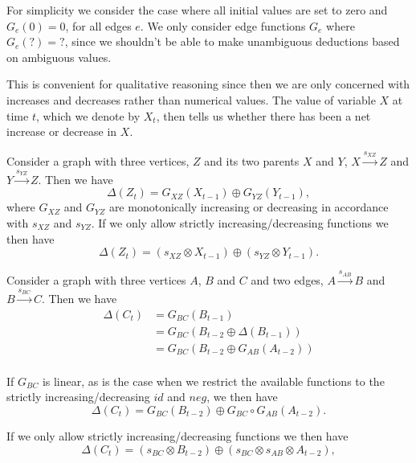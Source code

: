 For simplicity we consider the case where all initial values are
set to zero and $G_e(0)=0$, for all edges $e$. We only consider edge functions
$G_e$ where $G_e(?) = ?$, since we shouldn't be able to make unambiguous
deductions based on ambiguous values.
%

This is convenient for qualitative reasoning since then we are only
concerned with increases and decreases rather than numerical values.
%
The value of variable $X$ at time $t$, which we denote by $X_t$, then tells us whether there has been a net
increase or decrease in $X$.

Consider a graph with three vertices, $Z$ and its two parents
$X$ and $Y$, $X\xrightarrow{s_{XZ}} Z$ and $Y\xrightarrow{s_{YZ}} Z$.
%
Then we have
\[\Delta(Z_t) = G_{XZ}(X_{t-1}) \oplus G_{YZ}(Y_{t-1}),\]
where $G_{XZ}$ and $G_{YZ}$ are monotonically increasing or decreasing in
accordance with $s_{XZ}$ and $s_{YZ}$.
%
If we only allow strictly increasing/decreasing functions we then have
\[\Delta(Z_t) = (s_{XZ}\otimes X_{t-1})\oplus (s_{YZ}\otimes Y_{t-1}).\]

Consider a graph with three vertices $A$, $B$ and $C$ and two edges,
$A\xrightarrow{s_{AB}} B$ and $B\xrightarrow{s_{BC}} C$. Then we have
\begin{align*}
\Delta(C_t) &= G_{BC}(B_{t-1})\\
&= G_{BC}(B_{t-2} \oplus \Delta(B_{t-1}))\\
&= G_{BC}(B_{t-2}  \oplus G_{AB}(A_{t-2}))\\
\end{align*}

If $G_{BC}$ is linear, as is the case when we restrict the available functions
to the strictly increasing/decreasing $id$ and $neg$,
we then have
\[\Delta(C_t) = G_{BC}(B_{t-2})\oplus G_{BC}\circ G_{AB}(A_{t-2}).\]

If we only allow strictly increasing/decreasing functions we then have
\[\Delta(C_t) = (s_{BC}\otimes B_{t-2})\oplus (s_{BC}\otimes s_{AB}\otimes A_{t-2}),\]
